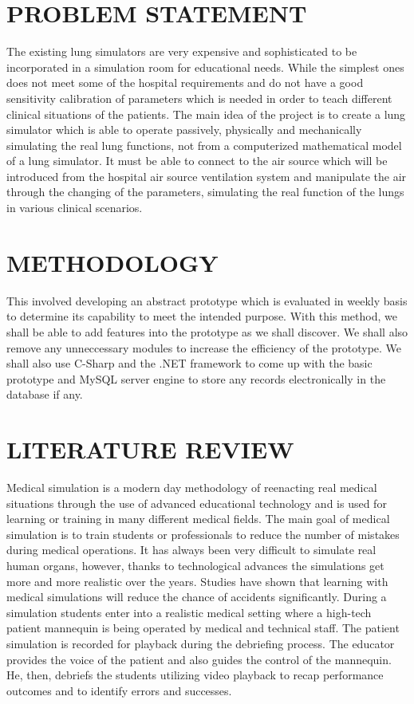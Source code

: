 \documentclass{article}
\begin{document}
\section{PROBLEM STATEMENT}
The existing lung simulators are very expensive and sophisticated to be incorporated in a simulation room for educational needs. While the simplest ones does not meet some of the hospital requirements and do not have a good sensitivity calibration of parameters which is needed in order to teach different clinical situations of the patients.
The main idea of the project is to create a lung simulator which is able to operate passively, physically and mechanically simulating the real lung functions, not from a computerized mathematical model of a lung simulator. It must be able to connect to the air source which will be introduced from the hospital air source ventilation system and manipulate the air through the changing of the parameters, simulating the real function of the lungs in various clinical scenarios.

\section{METHODOLOGY}
This involved developing an abstract prototype which is evaluated in weekly basis to determine its capability to meet the intended purpose. With this method, we shall be able to add features into the prototype as we shall discover. We shall also remove any unneccessary modules to increase the efficiency of the prototype. We shall also use C-Sharp and the .NET framework to come up with the basic prototype and MySQL server engine to store any records electronically in the database if any.

\section{LITERATURE REVIEW}
Medical simulation is a modern day methodology of reenacting real medical situations through the use of advanced educational technology and is used for learning or training in many different medical fields. The main goal of medical simulation is to train students or professionals to reduce the number of mistakes during medical operations. It has always been very difficult to simulate real human organs, however, thanks to technological advances the simulations get more and more realistic over the years. Studies have shown that learning with medical simulations will reduce the chance of accidents significantly.
During a simulation students enter into a realistic medical setting where a high-tech patient mannequin is being operated by medical and technical staff. The patient simulation is recorded for playback during the debriefing process. The educator provides the voice of the patient and also guides the control of the mannequin. He, then, debriefs the students utilizing video playback to recap performance outcomes and to identify errors and successes.
\end{document}
